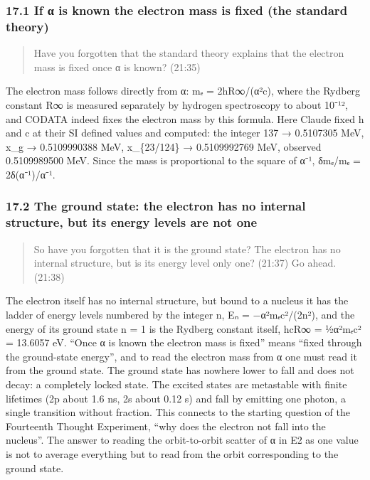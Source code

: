 \documentclass[
  a4paper,
]{article}
\begin{document}
\subsubsection{17.1 If α is known the electron mass is fixed (the
standard
theory)}\label{if-ux3b1-is-known-the-electron-mass-is-fixed-the-standard-theory}

\begin{quote}
Have you forgotten that the standard theory explains that the electron
mass is fixed once α is known? (21:35)
\end{quote}

The electron mass follows directly from α: mₑ = 2hR∞/(α²c), where the
Rydberg constant R∞ is measured separately by hydrogen spectroscopy to
about 10⁻¹², and CODATA indeed fixes the electron mass by this formula.
Here Claude fixed h and c at their SI defined values and computed: the
integer 137 → 0.5107305 MeV, x\_g → 0.5109990388 MeV, x\_\{23/124\} →
0.5109992769 MeV, observed 0.5109989500 MeV. Since the mass is
proportional to the square of α⁻¹, δmₑ/mₑ = 2δ(α⁻¹)/α⁻¹.

\subsubsection{17.2 The ground state: the electron has no internal
structure, but its energy levels are not
one}\label{the-ground-state-the-electron-has-no-internal-structure-but-its-energy-levels-are-not-one}

\begin{quote}
So have you forgotten that it is the ground state? The electron has no
internal structure, but is its energy level only one? (21:37) Go ahead.
(21:38)
\end{quote}

The electron itself has no internal structure, but bound to a nucleus it
has the ladder of energy levels numbered by the integer n, Eₙ =
−α²mₑc²/(2n²), and the energy of its ground state n = 1 is the Rydberg
constant itself, hcR∞ = ½α²mₑc² = 13.6057 eV. ``Once α is known the
electron mass is fixed'' means ``fixed through the ground-state
energy'', and to read the electron mass from α one must read it from the
ground state. The ground state has nowhere lower to fall and does not
decay: a completely locked state. The excited states are metastable with
finite lifetimes (2p about 1.6 ns, 2s about 0.12 s) and fall by emitting
one photon, a single transition without fraction. This connects to the
starting question of the Fourteenth Thought Experiment, ``why does the
electron not fall into the nucleus''. The answer to reading the
orbit-to-orbit scatter of α in E2 as one value is not to average
everything but to read from the orbit corresponding to the ground state.
\end{document}
